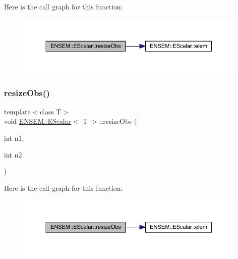 Here is the call graph for this function\+:
\nopagebreak
\begin{figure}[H]
\begin{center}
\leavevmode
\includegraphics[width=350pt]{d0/d82/classENSEM_1_1EScalar_ad4fe54c2fb8a3420e1e452228d8d40b1_cgraph}
\end{center}
\end{figure}
\mbox{\label{classENSEM_1_1EScalar_ad4fe54c2fb8a3420e1e452228d8d40b1}} 
\subsubsection{\texorpdfstring{resizeObs()}{resizeObs()}\hspace{0.1cm}{\footnotesize\ttfamily [4/8]}}
{\footnotesize\ttfamily template$<$class T$>$ \\
void \mbox{\hyperlink{classENSEM_1_1EScalar}{E\+N\+S\+E\+M\+::\+E\+Scalar}}$<$ T $>$\+::resize\+Obs (\begin{DoxyParamCaption}\item[{int}]{n1,  }\item[{int}]{n2 }\end{DoxyParamCaption})\hspace{0.3cm}{\ttfamily [inline]}}

Here is the call graph for this function\+:
\nopagebreak
\begin{figure}[H]
\begin{center}
\leavevmode
\includegraphics[width=350pt]{d0/d82/classENSEM_1_1EScalar_ad4fe54c2fb8a3420e1e452228d8d40b1_cgraph}
\end{center}
\end{figure}
\mbox{\label{classENSEM_1_1EScalar_a1849b1cf66ab1a983ca9e1f268afd109}} 
